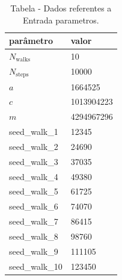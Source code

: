 \begin{table}[H]
\centering
\caption{Tabela - Dados referentes a Entrada parametros.}
\label{tab:entrada_parametros}
\begin{tabular}{ll}
\toprule
parâmetro & valor \\
\midrule
$N_{\mathrm{walks}}$ & 10 \\
$N_{\mathrm{steps}}$ & 10000 \\
$a$ & 1664525 \\
$c$ & 1013904223 \\
$m$ & 4294967296 \\
seed\_walk\_1 & 12345 \\
seed\_walk\_2 & 24690 \\
seed\_walk\_3 & 37035 \\
seed\_walk\_4 & 49380 \\
seed\_walk\_5 & 61725 \\
seed\_walk\_6 & 74070 \\
seed\_walk\_7 & 86415 \\
seed\_walk\_8 & 98760 \\
seed\_walk\_9 & 111105 \\
seed\_walk\_10 & 123450 \\
\bottomrule
\end{tabular}

\end{table}
